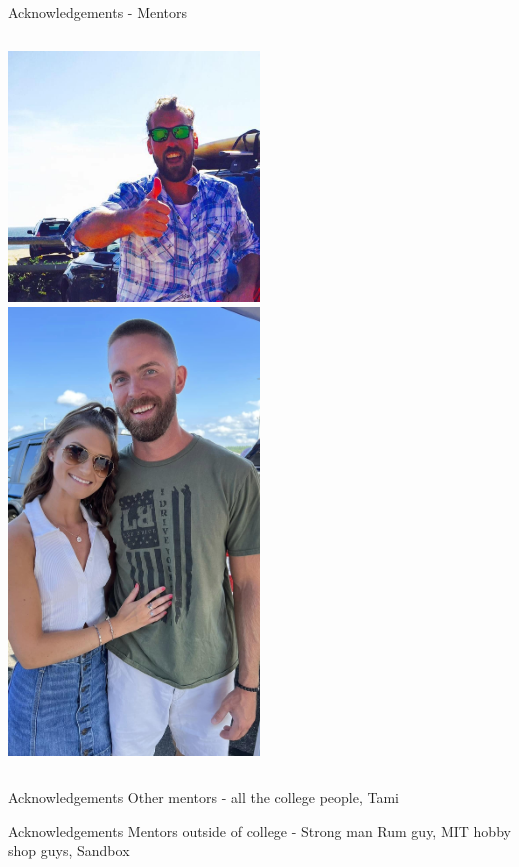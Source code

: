 \documentclass[aspectratio=169]{beamer}
\begin{document}
\begin{frame}{Acknowledgements - Mentors}
\begin{columns}
            \centering
            \includegraphics[width=0.5\textwidth]{people/docs/jon.png}
            \includegraphics[width=0.5\textwidth]{people/docs/stravinsky.png}
    \end{columns}
\end{frame}



\begin{frame}{Acknowledgements}
Other mentors - all the college people, Tami
\end{frame}

\begin{frame}{Acknowledgements}
Mentors outside of college - Strong man Rum guy, MIT hobby shop guys, Sandbox
\end{frame}
\end{document}
